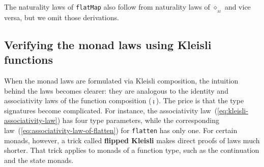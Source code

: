 \begin{comment}
Require two additional laws that connect $\diamond$, $\text{fmap}$,
and $\bef$:

Right naturality: $f^{A\rightarrow S^{B}}\bef\text{fmap}\,g^{B\rightarrow C}=f\diamond\left(g\bef\text{pure}\right)$

So, can define fmap through Kleisli: $\text{fmap}\,g^{A\rightarrow B}\equiv\text{id}^{S^{A}\rightarrow S^{A}}\diamond\left(g\bef\text{pure}\right)$

The laws for pure and flatMap then follow from category axioms for
Kleisli:

Left and right identity laws follow from $\text{id}\diamond\text{pure}=\text{id}$
and $\text{pure}\diamond f=f$ 

Associativity for flatMap follows from $\left(\text{id}\diamond f\right)\diamond g=\text{id}\diamond\left(f\diamond g\right)$

Use \textsf{``}left naturality\textsf{''}, get: $\left(f\bef g\right)\diamond h=\left(f\bef pure\right)\diamond g\diamond h=f\bef\left(g\diamond h\right)$

Naturality for pure: $\text{pure}\bef\text{fmap}\,f=\text{pure}\diamond\left(f\bef\text{pure}\right)=f\bef\text{pure}$

Define flatten: $\text{ftn}=\text{id}^{S^{S^{A}}\rightarrow S^{S^{A}}}\diamond\text{id}^{S^{A}\rightarrow S^{A}}$

Naturality for flatten: $\text{ftn}\bef\text{fmap}\,f=\text{id}\diamond\text{id}\diamond\left(f\bef\text{pure}\right)=\text{id}\diamond\text{fmap}\,f$
and $\text{fmap}\left(\text{fmap}\,f\right)\bef\text{ftn}=\text{id}\diamond\left(\left(\text{fmap}\,f\right)\bef\text{pure}\right)\bef\text{id}\diamond\text{id}=\text{id}\diamond\text{fmap}\,f$
\end{comment}

The naturality laws of \lstinline!flatMap! also follow from naturality
laws of $\diamond_{_{M}}$ and vice versa, but we omit those derivations. 

\subsection{Verifying the monad laws using Kleisli functions}

When the monad laws are formulated via Kleisli composition, the intuition
behind the laws becomes clearer: they are analogous to the identity
and associativity laws of the function composition ($\bef$). The
price is that the type signatures become complicated. For instance,
the associativity law~(\ref{eq:kleisli-associativity-law}) has four
type parameters, while the corresponding law~(\ref{eq:associativity-law-of-flatten})
for \lstinline!flatten! has only one. For certain monads, however,
a trick called \textbf{flipped
Kleisli} makes direct proofs of laws much shorter. That trick applies
to monads of a function type, such as the continuation and the state
monads.

